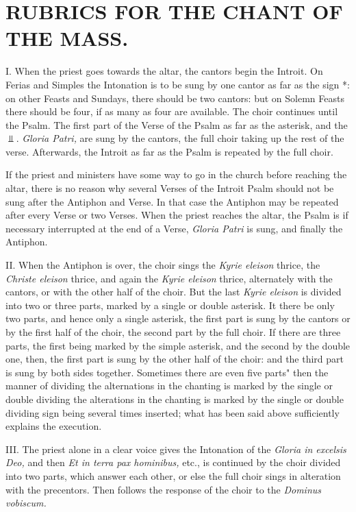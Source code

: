 \section{RUBRICS FOR THE CHANT OF THE MASS.}

I. \quad When the priest goes towards the altar, the cantors begin the Introit. On Ferias and Simples the Intonation is to be sung by one cantor as far as the sign *: on other Feasts and Sundays, there should be two cantors: but on Solemn Feasts there should be four, if as many as four are available. The choir continues until the Psalm. The first part of the Verse of the Psalm as far as the asterisk, and the $\Vbar$. {\it Gloria Patri,} are sung by the cantors, the full choir taking up the rest of the verse. Afterwards, the Introit as far as the Psalm is repeated by the full choir.

If the priest and ministers have some way to go in the church before reaching the altar, there is no reason why several Verses of the Introit Psalm should not be sung after the Antiphon and Verse. In that case the Antiphon may be repeated after every Verse or two Verses. When the priest reaches the altar, the Psalm is if necessary interrupted at the end of a Verse, {\it Gloria Patri} is sung, and finally the Antiphon.

II. \quad When the Antiphon is over, the choir sings the {\it Kyrie eleison} thrice, the {\it Christe eleison} thrice, and again the {\it Kyrie eleison} thrice, alternately with the cantors, or with the other half of the choir. But the last {\it Kyrie eleison} is divided into two or three parts, marked by a single or double asterisk. It there be only two parts, and hence only a single asterisk, the first part is sung by the cantors or by the first half of the choir, the second part by the full choir. If there are three parts, the first being marked by the simple asterisk, and the second by the double one, then, the first part is sung by the other half of the choir: and the third part is sung by both sides together. Sometimes there are even five parts" then the manner of dividing the alternations in the chanting is marked by the single or double dividing the alterations in the chanting is marked by the single or double dividing sign being several times inserted; what has been said above sufficiently explains the execution.

III. \quad The priest alone in a clear voice gives the Intonation of the {\it Gloria in excelsis Deo,} and then {\it Et in terra pax hominibus,} etc., is continued by the choir divided into two parts, which answer each other, or else the full choir sings in alteration with the precentors. Then follows the response of the choir to the {\it Dominus vobiscum.}

